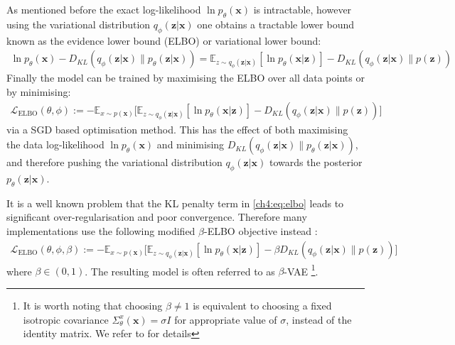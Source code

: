 As mentioned before the exact log-likelihood $\ln p_{\theta}(\textbf{x})$ is intractable, however using the variational distribution $q_\phi( \textbf{z} | \textbf{x})$ one obtains a tractable lower bound known as the evidence lower bound (ELBO) or variational lower bound:
\begin{gather*}
    \ln p_\theta(\textbf{x}) - D_{KL}( q_\phi( \textbf{z} | \textbf{x}) \parallel p_\theta( \textbf{z} | \textbf{x})) =  \mathbb{E}_{z \sim q_\phi( \textbf{z} | \textbf{x})}[\ln p_\theta(\textbf{x} | \textbf{z})] - D_{KL}( q_\phi( \textbf{z} | \textbf{x}) \parallel p( \textbf{z}))
\end{gather*}
Finally the model can be trained by maximising the ELBO over all data points or by minimising:
\begin{gather}
\label{ch4:eq:elbo}
    \mathcal{L}_{\text{ELBO}}(\theta, \phi) := -\mathbb{E}_{x \sim p(\textbf{x})} \big[ \mathbb{E}_{z \sim q_\phi( \textbf{z} | \textbf{x})}[\ln p_\theta(\textbf{x} | \textbf{z})] - D_{KL}( q_\phi( \textbf{z} | \textbf{x}) \parallel p( \textbf{z})) \big]
\end{gather}
via a SGD based optimisation method.
This has the effect of both maximising the data log-likelihood $\ln p_\theta(\textbf{x})$ and minimising $D_{KL}( q_\phi( \textbf{z} | \textbf{x}) \parallel p_\theta( \textbf{z} | \textbf{x}))$, and therefore pushing the variational distribution $q_\phi( \textbf{z} | \textbf{x})$ towards the posterior $ p_\theta( \textbf{z} | \textbf{x})$.

It is a well known problem that the KL penalty term in \ref{ch4:eq:elbo} leads to significant over-regularisation and poor convergence. Therefore many implementations use the following modified $\beta$-ELBO objective instead \cite{higgins2016beta_vae}:
\begin{gather}
\label{ch4:eq:elbo}
    \mathcal{L}_{\text{ELBO}}(\theta, \phi, \beta) := -\mathbb{E}_{x \sim p(\textbf{x})} \big[ \mathbb{E}_{z \sim q_\phi( \textbf{z} | \textbf{x})}[\ln p_\theta(\textbf{x} | \textbf{z})] - \beta D_{KL}( q_\phi( \textbf{z} | \textbf{x}) \parallel p( \textbf{z})) \big]
\end{gather}
where $\beta \in (0,1)$. The resulting model is often referred to as $\beta$-VAE \footnote{It is worth noting that choosing $\beta \not = 1$ is equivalent to choosing a fixed isotropic covariance $\Sigma^x_\theta(\textbf{x}) = \sigma I$ for appropriate value of $\sigma$, instead of the identity matrix. We refer to \cite{rybkin2021sigma_vae} for details}.

